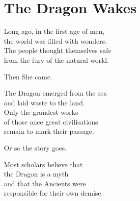 \documentclass[12pt, a5paper, parskip=half-]{scrartcl}
\begin{document}


%		
%
%
%
%
%
%		


\setmainfont{URWClassico}
\normalsize


\center

\setcounter{page}{1}
\section*{\huge \phantom{a} \hfill The Dragon Wakes \hfill \phantom{a}} \label{section:the-dragon-wakes}
\bigskip
Long ago, in the first age of men,\\
the world was filled with wonders. \\
The people thought themselves safe \\
from the fury of the natural world.

\medskip

Then She came.

\medskip

The Dragon emerged from the sea\\and laid waste to the land.\\
Only the grandest works\\of those once great civilisations\\remain to mark their passage.

\medskip

Or so the story goes.

\medskip

Most scholars believe that\\the Dragon is a myth\\and that the Ancients were\\responsible for their own demise.
\end{document}

